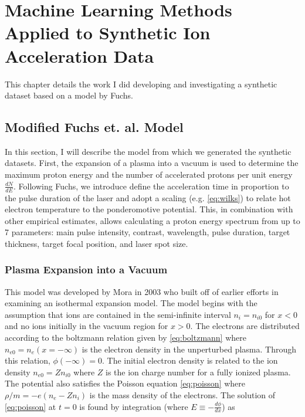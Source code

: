 \chapter{Machine Learning Methods Applied to Synthetic Ion Acceleration Data} \label{ch:5}

This chapter details the work I did developing and investigating a synthetic dataset based on a model by Fuchs\cite{Fuchs_2005_Nat}.

\section{Modified Fuchs et. al. Model}

In this section, I will describe the model from which we generated the synthetic datasets\cite{Desai_2024_CPP,Desai_2024_arX}. First, the expansion of a plasma into a vacuum\cite{Mora_2003_PRL} is used to determine the maximum proton energy and the number of accelerated protons per unit energy $\frac{dN}{dE}$. Following Fuchs\cite{Fuchs_2005_Nat}, we introduce define the acceleration time in proportion to the pulse duration of the laser and adopt a scaling (e.g. \cref{eq:wilks}) to relate hot electron temperature to the ponderomotive potential. This, in combination with other empirical estimates, allows calculating a proton energy spectrum from up to 7 parameters: main pulse intensity, contrast, wavelength, pulse duration, target thickness, target focal position, and laser spot size.

\subsection{Plasma Expansion into a Vacuum}

This model was developed by Mora\cite{Mora_2003_PRL} in 2003 who built off of earlier efforts\cite{Crow_1975_JPP,Kishimoto_1983_PoF} in examining an isothermal expansion model. The model begins with the assumption that ions are contained in the semi-infinite interval $n_i = n_{i0}$ for $x < 0$ and no ions initially in the vacuum region for $x > 0$. The electrons are distributed according to the boltzmann relation given by \cref{eq:boltzmann} where $n_{e0} = n_e(x = -\infty)$ is the electron density in the unperturbed plasma. Through this relation, $\phi(-\infty) = 0$. The initial electron density is related to the ion density $n_{e0} = Z n_{i0}$ where $Z$ is the ion charge number for a fully ionized plasma. The potential also satisfies the Poisson equation \cref{eq:poisson} where $\rho/m = - e (n_e - Z n_i)$ is the mass density of the electrons. The solution of \cref{eq:poisson} at $t=0$ is found by integration\cite{Crow_1975_JPP} (where $E \equiv -\frac{d\phi}{dx}$) as 

